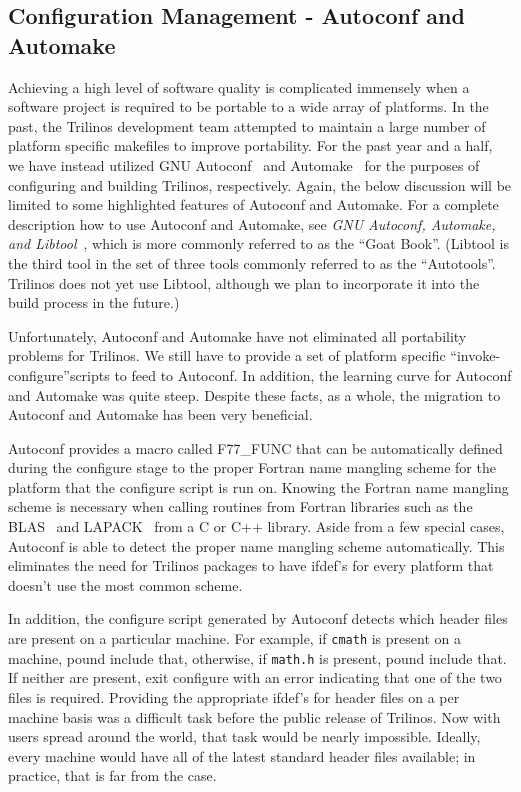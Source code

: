 \documentclass[12pt,relax]{article}
\newcommand{\InlineDirectory}[1]{
  {\hspace{0.01 in}} {\tt #1} {\hspace{0.01 in}}}
\begin{document}
\subsection{Configuration Management - Autoconf and Automake}

Achieving a high level of software quality is complicated immensely when 
a software project is required to be portable to a wide array of platforms.
In the past, the Trilinos development team attempted to maintain a large 
number of platform specific makefiles to improve portability.  For the past 
year and a half, we have instead utilized GNU Autoconf~\cite{Autoconf} and 
Automake~\cite{Automake} for 
the purposes of configuring and building Trilinos, respectively.  Again, 
the below discussion will be limited to some highlighted features of Autoconf 
and Automake.  
For a complete description how to use Autoconf and Automake, see 
{\it GNU Autoconf, Automake, and Libtool}~\cite{GoatBook}, which is 
more commonly referred to as the ``Goat Book''.  (Libtool is the third tool 
in the set of three tools commonly referred to as the ``Autotools''.  Trilinos 
does not yet use Libtool, although we plan to incorporate it into the build 
process in the future.)

Unfortunately, Autoconf and Automake have not eliminated all portability 
problems for Trilinos.  We still have to provide a set of platform specific
``invoke-configure''scripts to feed to Autoconf.  In addition, the learning 
curve for Autoconf and Automake was quite steep.  Despite these facts, 
as a whole, the migration to Autoconf and Automake has been very 
beneficial.  

Autoconf provides a macro called F77\_FUNC that can be 
automatically defined during the configure stage to the proper Fortran
name mangling scheme for the platform that the configure script is run on.  
Knowing the Fortran name mangling scheme is necessary when calling routines 
from Fortran libraries such as the BLAS~\cite{BLAS1,BLAS2,BLAS3} and 
LAPACK~\cite{lapack} from a C or C++ library.  Aside from a few special cases, 
Autoconf is able to detect the proper name mangling scheme automatically.  
This eliminates the need for Trilinos packages to have ifdef's for every 
platform that doesn't use the most common scheme.

In addition, the configure script generated by Autoconf detects which 
header files are present on a particular 
machine.  For example, if \InlineDirectory{cmath} is present on a machine, 
pound include that, otherwise, if \InlineDirectory{math.h} is present, pound 
include that.  If neither are present, exit configure with an error indicating 
that one of the two files is required.  Providing the appropriate ifdef's 
for header files on a per machine basis was a difficult task before the 
public release of Trilinos.  Now with users spread around the world, that 
task would be nearly impossible.  Ideally, every machine would 
have all of the latest standard header files available; in practice, that 
is far from the case.
\end{document}
